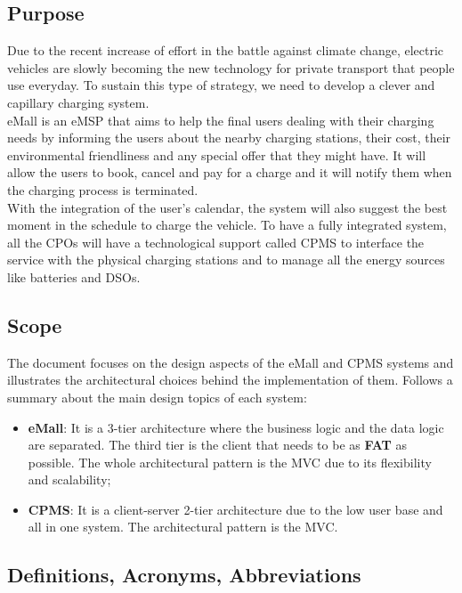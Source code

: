 \subsection{Purpose}
Due to the recent increase of effort in the battle against climate change, electric vehicles are slowly becoming the new technology for private transport that   people use everyday.
To sustain this type of strategy, we need to develop a clever and capillary charging system.\\
\acf{eMall} is an \acf{eMSP} that aims to help the final users dealing with their charging needs by informing the users about the nearby charging stations, their cost, their environmental friendliness and any special offer that they might have.
It will allow the users to book, cancel and pay for a charge and it will notify them when the charging process is terminated.\\
With the integration of the user's calendar, the system will also suggest the best moment in the schedule to charge the vehicle.
To have a fully integrated system, all the \acfp{CPO} will have a technological support called \acf{CPMS} to interface the service with the physical charging stations and to manage all the energy sources like batteries and \acfp{DSO}.
\subsection{Scope}
The document focuses on the design aspects of the \ac{eMall} and \ac{CPMS} systems and illustrates the architectural choices behind the implementation of them. Follows a summary about the main design topics of each system:
\begin{itemize}
    \item \textbf{\ac{eMall}}: It is a 3-tier architecture where the business logic and the data logic are separated. The third tier is the client that needs to be as \textbf{FAT} as possible. The whole architectural pattern is the \ac{MVC} due to its flexibility and scalability;
    \item \textbf{\ac{CPMS}}: It is a client-server 2-tier architecture due to the low user base and all in one system. The architectural pattern is the \ac{MVC}.
\end{itemize}

\clearpage
\subsection{Definitions, Acronyms, Abbreviations}
